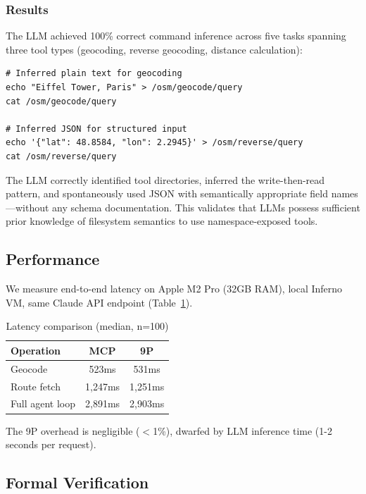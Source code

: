 \documentclass{article}
\begin{document}
\subsubsection{Results}

The LLM achieved 100\% correct command inference across five tasks spanning three tool types (geocoding, reverse geocoding, distance calculation):

\begin{lstlisting}[caption={LLM-generated commands from namespace alone}]
# Inferred plain text for geocoding
echo "Eiffel Tower, Paris" > /osm/geocode/query
cat /osm/geocode/query

# Inferred JSON for structured input
echo '{"lat": 48.8584, "lon": 2.2945}' > /osm/reverse/query
cat /osm/reverse/query
\end{lstlisting}

The LLM correctly identified tool directories, inferred the write-then-read pattern, and spontaneously used JSON with semantically appropriate field names---without any schema documentation. This validates that LLMs possess sufficient prior knowledge of filesystem semantics to use namespace-exposed tools.

\subsection{Performance}

We measure end-to-end latency on Apple M2 Pro (32GB RAM), local Inferno VM, same Claude API endpoint (Table~\ref{tab:latency}).

\begin{table}[h]
\centering
\begin{tabular}{lcc}
\hline
\textbf{Operation} & \textbf{MCP} & \textbf{9P} \\
\hline
Geocode & 523ms & 531ms \\
Route fetch & 1,247ms & 1,251ms \\
Full agent loop & 2,891ms & 2,903ms \\
\hline
\end{tabular}
\caption{Latency comparison (median, n=100)}
\label{tab:latency}
\end{table}

The 9P overhead is negligible ($<$1\%), dwarfed by LLM inference time (1-2 seconds per request).

\subsection{Formal Verification}
\end{document}
